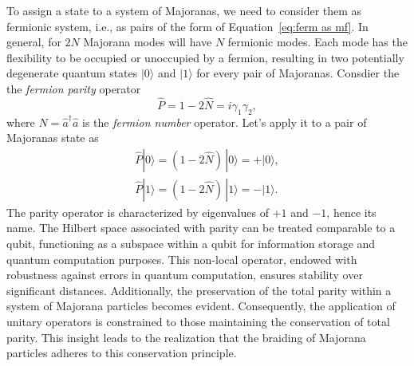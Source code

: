 \documentclass{article}
\begin{document}
To assign a state to a system of Majoranas, we need to consider them as fermionic system, i.e., as pairs of the form of Equation~\ref{eq:ferm as mf}. In general, for $ 2N $ Majorana modes will have $ N $ fermionic modes. Each mode has the flexibility to be occupied or unoccupied by a fermion, resulting in two potentially degenerate quantum states $ | 0 \rangle $ and $ | 1 \rangle $ for every pair of Majoranas. Consdier the the \textit{fermion parity} operator
\begin{equation}
	\hat{P} = 1- 2 \hat{N} = i \gamma_1 \gamma_2,
	\label{eq:ferm parity}
\end{equation}
where $ N = \hat{a}^\dagger \hat{a} $ is the \textit{fermion number} operator. Let's apply it to a pair of Majoranas state as
$$
	\begin{aligned}
		\hat{P} |0\rangle = (1-2\hat{N})\, |0\rangle = + |0\rangle, \\
		\hat{P} |1\rangle = (1-2\hat{N})\, |1\rangle = - |1\rangle.
	\end{aligned}
$$
The parity operator is characterized by eigenvalues of $ +1 $ and $ -1 $, hence its name. The Hilbert space associated with parity can be treated comparable to a qubit, functioning as a subspace within a qubit for information storage and quantum computation purposes. This non-local operator, endowed with robustness against errors in quantum computation, ensures stability over significant distances. Additionally, the preservation of the total parity within a system of Majorana particles becomes evident. Consequently, the application of unitary operators is constrained to those maintaining the conservation of total parity. This insight leads to the realization that the braiding of Majorana particles adheres to this conservation principle.
\end{document}
